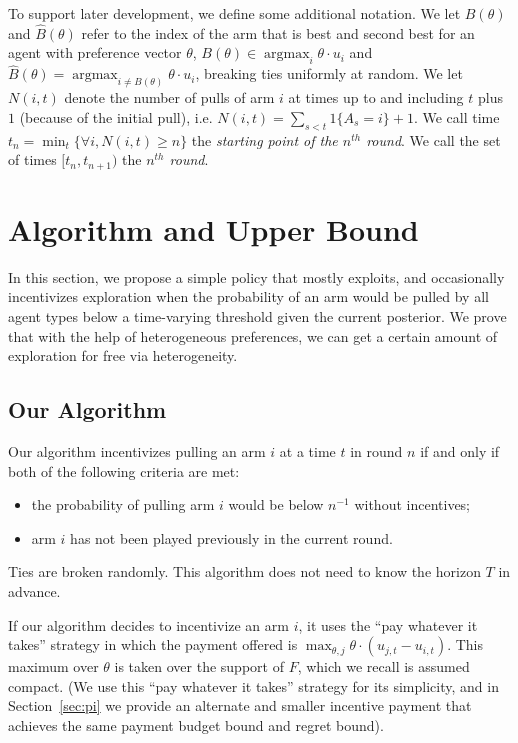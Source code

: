 \documentclass[twoside,11pt]{article}
\newcommand{\argmax}{\mathop{\mathrm{argmax}}}
\begin{document}
To support later development, we define some additional notation.
We let $B(\theta)$ and $\hat{B}(\theta)$ refer to the index of the arm that is best and second best for an agent with preference vector $\theta$, $B(\theta) \in \argmax_i \theta \cdot u_i$ and $\hat{B}(\theta)=\argmax_{i\neq B(\theta)}\theta\cdot u_{i}$, breaking ties uniformly at random. We let $N(i,t)$ denote the number of pulls of arm $i$ at times up to and including $t$ plus $1$ (because of the initial pull), i.e. $N(i,t)=\sum_{s<t} 1\{A_s = i\}+1$.
We call time $t_{n}=\min_{t}\{\forall i, N(i,t)\geq n\}$ the {\it starting point of the $n^{th}$ round}. We call the set of times $[t_{n}, t_{n+1})$ the {\it $n^{th}$ round}.


\section{Algorithm and Upper Bound}
\label{sec:ub}

In this section, we propose a simple policy that mostly exploits, and occasionally incentivizes exploration when the probability of an arm would be pulled by all agent types below a time-varying threshold given the current posterior. We prove that with the help of heterogeneous preferences, we can get a certain amount of exploration for free via heterogeneity. 

\subsection{Our Algorithm}
Our algorithm incentivizes pulling an arm $i$ at a time $t$ in round $n$ if and only if both of the following criteria are met:
\begin{itemize}
\item the probability of pulling arm $i$ would be below $n^{-1}$ without incentives; 
\item arm $i$ has not been played previously in the current round.
\end{itemize}
Ties are broken randomly.  This algorithm does not need to know the horizon $T$ in advance. 

If our algorithm decides to incentivize an arm $i$, it uses the ``pay whatever it takes'' strategy in which the payment offered is $\max_{\theta,j} \theta \cdot (u_{j,t} - u_{i,t})$. This maximum over $\theta$ is taken over the support of $F$, which we recall is assumed compact.  (We use this ``pay whatever it takes'' strategy for its simplicity, and in Section~\ref{sec:pi} we provide an alternate and smaller incentive payment that achieves the same payment budget bound and regret bound). 
\end{document}
